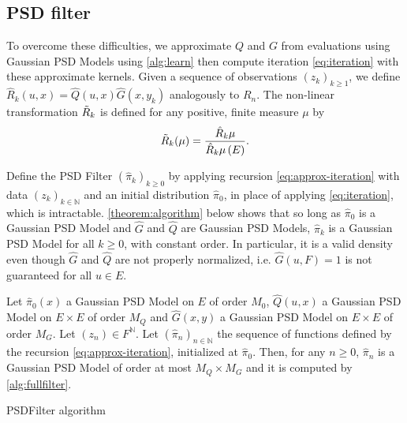 \subsection{PSD filter}\label{sec:psdfilter}
To overcome these difficulties, we approximate $Q$ and $G$ from evaluations using Gaussian PSD Models using \cref{alg:learn} then compute iteration \cref{eq:iteration} with these approximate kernels. Given a sequence of observations $(z_k)_{k\geq 1}$, we define $\hat R_k(u, x) = \hat Q(u, x)\hat G(x, y_k)$ analogously to $R_n$. The non-linear transformation $\tilde{{R}}_k$ is defined for any positive, finite measure $\mu$ by
\begin{align}\label{eq:approx-iteration}
    \tilde{{R}}_k (\mu) = \frac{\hat R_k\mu}{\hat R_k\mu\,(E)}.
\end{align}
%

Define the PSD Filter $(\hat \pi_k)_{k\geq 0}$ by applying recursion \cref{eq:approx-iteration} with data $(z_{k})_{k\in\mathbb N}$ and an initial distribution $\hat \pi_0$, in place of applying \cref{eq:iteration}, which is intractable. \cref{theorem:algorithm} below shows that so long as $\hat \pi_0$ is a Gaussian PSD Model and $\hat G$ and $\hat Q$ are Gaussian PSD Models, $\hat \pi_k$ is a Gaussian PSD Model for all $k\geq 0$, with constant order. In particular, it is a valid density even though $\hat G$ and $\hat Q$ are not properly normalized, i.e. $\hat G(u, F)=1$ is not guaranteed for all $u\in E$.

\begin{corollary} \label{theorem:algorithm}
    Let $\hat \pi_0(x)$ a Gaussian PSD Model on $E$ of order $M_0$, $\hat Q(u, x)$ a Gaussian PSD Model on $E\times E$ of order $M_Q$ and $\hat G(x, y)$ a Gaussian PSD Model on $E\times E$ of order $M_G$. Let $(z_n)\in F^\mathbb N$. Let $(\hat \pi_n)_{n\in\mathbb N}$ the sequence of functions defined by the recursion \cref{eq:approx-iteration}, initialized at $\hat \pi_0$. Then, for any $n\geq 0$, $\hat \pi_n$ is a Gaussian PSD Model of order at most $M_Q \times M_G$ and it is computed by \cref{alg:fullfilter}.
\end{corollary}

\begin{algorithm}[ht!]
\caption{PSDFilter algorithm}\label{alg:fullfilter}
{}
\end{algorithm}

